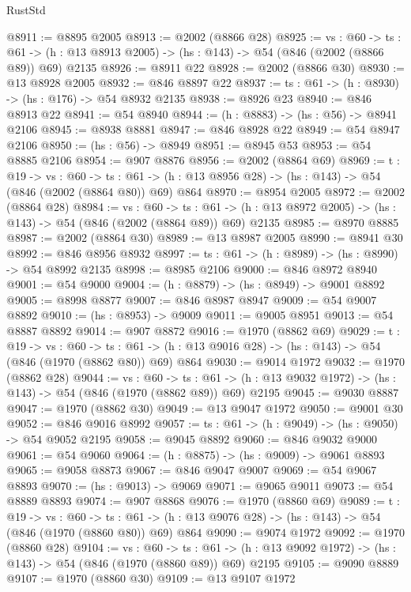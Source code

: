 \begin{lexlean}{RustStd}
\begin{coremodule}
@8911 := @8895 @2005
@8913 := @2002 (@8866 @28)
@8925 := {vs : @60} ->
  {ts : @61} -> (h : @13 @8913 @2005) -> (hs : @143) -> @54 (@846 (@2002 (@8866 @89)) @69) @2135
@8926 := @8911 @22
@8928 := @2002 (@8866 @30)
@8930 := @13 @8928 @2005
@8932 := @846 @8897 @22
@8937 := {ts : @61} -> (h : @8930) -> (hs : @176) -> @54 @8932 @2135
@8938 := @8926 @23
@8940 := @846 @8913 @22
@8941 := @54 @8940
@8944 := (h : @8883) -> (hs : @56) -> @8941 @2106
@8945 := @8938 @8881
@8947 := @846 @8928 @22
@8949 := @54 @8947 @2106
@8950 := (hs : @56) -> @8949
@8951 := @8945 @53
@8953 := @54 @8885 @2106
@8954 := @907 @8876
@8956 := @2002 (@8864 @69)
@8969 := {t : @19} ->
  {vs : @60} ->
  {ts : @61} -> (h : @13 @8956 @28) -> (hs : @143) -> @54 (@846 (@2002 (@8864 @80)) @69) @864
@8970 := @8954 @2005
@8972 := @2002 (@8864 @28)
@8984 := {vs : @60} ->
  {ts : @61} -> (h : @13 @8972 @2005) -> (hs : @143) -> @54 (@846 (@2002 (@8864 @89)) @69) @2135
@8985 := @8970 @8885
@8987 := @2002 (@8864 @30)
@8989 := @13 @8987 @2005
@8990 := @8941 @30
@8992 := @846 @8956 @8932
@8997 := {ts : @61} -> (h : @8989) -> (hs : @8990) -> @54 @8992 @2135
@8998 := @8985 @2106
@9000 := @846 @8972 @8940
@9001 := @54 @9000
@9004 := (h : @8879) -> (hs : @8949) -> @9001 @8892
@9005 := @8998 @8877
@9007 := @846 @8987 @8947
@9009 := @54 @9007 @8892
@9010 := (hs : @8953) -> @9009
@9011 := @9005 @8951
@9013 := @54 @8887 @8892
@9014 := @907 @8872
@9016 := @1970 (@8862 @69)
@9029 := {t : @19} ->
  {vs : @60} ->
  {ts : @61} -> (h : @13 @9016 @28) -> (hs : @143) -> @54 (@846 (@1970 (@8862 @80)) @69) @864
@9030 := @9014 @1972
@9032 := @1970 (@8862 @28)
@9044 := {vs : @60} ->
  {ts : @61} -> (h : @13 @9032 @1972) -> (hs : @143) -> @54 (@846 (@1970 (@8862 @89)) @69) @2195
@9045 := @9030 @8887
@9047 := @1970 (@8862 @30)
@9049 := @13 @9047 @1972
@9050 := @9001 @30
@9052 := @846 @9016 @8992
@9057 := {ts : @61} -> (h : @9049) -> (hs : @9050) -> @54 @9052 @2195
@9058 := @9045 @8892
@9060 := @846 @9032 @9000
@9061 := @54 @9060
@9064 := (h : @8875) -> (hs : @9009) -> @9061 @8893
@9065 := @9058 @8873
@9067 := @846 @9047 @9007
@9069 := @54 @9067 @8893
@9070 := (hs : @9013) -> @9069
@9071 := @9065 @9011
@9073 := @54 @8889 @8893
@9074 := @907 @8868
@9076 := @1970 (@8860 @69)
@9089 := {t : @19} ->
  {vs : @60} ->
  {ts : @61} -> (h : @13 @9076 @28) -> (hs : @143) -> @54 (@846 (@1970 (@8860 @80)) @69) @864
@9090 := @9074 @1972
@9092 := @1970 (@8860 @28)
@9104 := {vs : @60} ->
  {ts : @61} -> (h : @13 @9092 @1972) -> (hs : @143) -> @54 (@846 (@1970 (@8860 @89)) @69) @2195
@9105 := @9090 @8889
@9107 := @1970 (@8860 @30)
@9109 := @13 @9107 @1972

\end{coremodule}
\end{lexlean}

